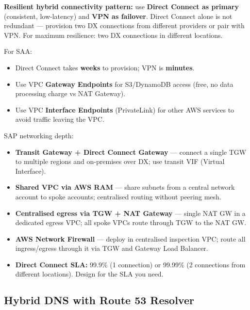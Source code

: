 \begin{examtip}
\textbf{Resilient hybrid connectivity pattern:} use \textbf{Direct Connect as primary} (consistent, low-latency) and \textbf{VPN as failover}. Direct Connect alone is not redundant --- provision two DX connections from different providers or pair with VPN. For maximum resilience: two DX connections in different locations.
\end{examtip}

\begin{saadepth}
For SAA:
\begin{itemize}
  \item Direct Connect takes \textbf{weeks} to provision; VPN is \textbf{minutes}.
  \item Use VPC \textbf{Gateway Endpoints} for S3/DynamoDB access (free, no data processing charge vs NAT Gateway).
  \item Use VPC \textbf{Interface Endpoints} (PrivateLink) for other AWS services to avoid traffic leaving the VPC.
\end{itemize}
\end{saadepth}

\begin{sapdepth}
SAP networking depth:
\begin{itemize}
  \item \textbf{Transit Gateway + Direct Connect Gateway} --- connect a single TGW to multiple regions and on-premises over DX; use transit VIF (Virtual Interface).
  \item \textbf{Shared VPC via AWS RAM} --- share subnets from a central network account to spoke accounts; centralised routing without peering mesh.
  \item \textbf{Centralised egress via TGW + NAT Gateway} --- single NAT GW in a dedicated egress VPC; all spoke VPCs route through TGW to the NAT GW.
  \item \textbf{AWS Network Firewall} --- deploy in centralised inspection VPC; route all ingress/egress through it via TGW and Gateway Load Balancer.
  \item \textbf{Direct Connect SLA:} 99.9\% (1 connection) or 99.99\% (2 connections from different locations). Design for the SLA you need.
\end{itemize}
\end{sapdepth}

\subsection{Hybrid DNS with Route 53 Resolver}

